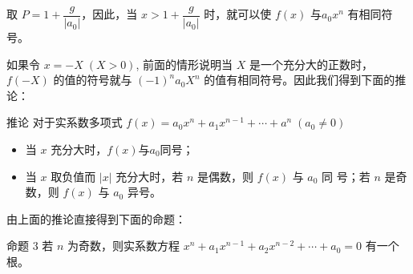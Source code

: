 \medskip
取 $P=1+\dfrac{g}{|a_0|}$，因此，当 $x>1+\dfrac{g}{|a_0|}$ 时，就可以使 $f(x)$ 与$a_0x^n$ 有相同符号。

如果令 $x=-X\; (X>0)$, 前面的情形说明当 $X$ 是一个充分大的正数时，$f(-X)$ 的值的符号就与 $(-1)^na_0X^n$ 的值有相同符号。因此我们得到下面的推论：
\begin{Deduction}{推论}
    对于实系数多项式 $f(x)=a_0x^n+a_1x^{n-1}+\cdots+a^n\; (a_0\ne 0)$
\begin{itemize}
    \item 当 $x$ 充分大时，$f(x)$与$a_0$同号；
    \item 当 $x$ 取负值而 $|x|$ 充分大时，若 $n$ 是偶数，则 $f(x)$ 与 $a_0$ 同
号；若 $n$ 是奇数，则 $f(x)$ 与 $a_0$ 异号。
\end{itemize}
\end{Deduction}

由上面的推论直接得到下面的命题：
\begin{Theorem}{命题 3}
  若 $n$ 为奇数，则实系数方程 $x^n+a_1x^{n-1}+a_2x^{n-2}+\cdots+a_0=0$ 有一个根。 
\end{Theorem}

